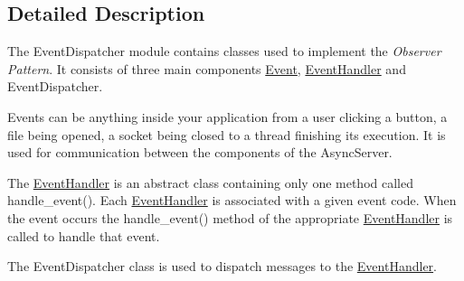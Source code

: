 \subsection{Detailed Description}
The Event\-Dispatcher module contains classes used to implement the {\itshape Observer Pattern}. It consists of three main components \hyperlink{class_event_dispatcher_1_1_event}{Event}, \hyperlink{class_event_dispatcher_1_1_event_handler}{Event\-Handler} and Event\-Dispatcher.

Events can be anything inside your application from a user clicking a button, a file being opened, a socket being closed to a thread finishing its execution. It is used for communication between the components of the Async\-Server.

The \hyperlink{class_event_dispatcher_1_1_event_handler}{Event\-Handler} is an abstract class containing only one method called handle\-\_\-event(). Each \hyperlink{class_event_dispatcher_1_1_event_handler}{Event\-Handler} is associated with a given event code. When the event occurs the handle\-\_\-event() method of the appropriate \hyperlink{class_event_dispatcher_1_1_event_handler}{Event\-Handler} is called to handle that event.

The Event\-Dispatcher class is used to dispatch messages to the \hyperlink{class_event_dispatcher_1_1_event_handler}{Event\-Handler}. 